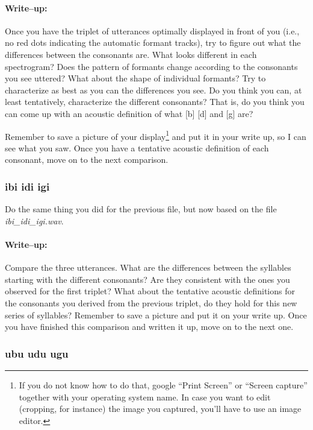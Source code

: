 \paragraph{Write--up:} Once you have the triplet of utterances optimally displayed in front of you (i.e., no red dots indicating the automatic formant tracks), try to figure out what the differences between the consonants are. What looks different in each spectrogram? Does the pattern of formants change according to the consonants you see uttered? What about the shape of individual formants? Try to characterize as best as you can the differences you see. Do you think you can, at least tentatively, characterize the different consonants? That is, do you think you can come up with an acoustic definition of what [b] [d] and [g] are?

Remember to save a picture of your display\footnote{If you do not know how to do that, google ``Print Screen'' or ``Screen capture'' together with your operating system name. In case you want to edit (cropping, for instance) the image you captured, you'll have to use an image editor.} and put it in your write up, so I can see what you saw. Once you have a tentative acoustic definition of each consonant, move on to the next comparison.

\subsubsection{ibi idi igi}

Do the same thing you did for the previous file, but now based on the file \emph{ibi\_idi\_igi.wav}.

\paragraph{Write--up:} Compare the three utterances. What are the differences between the syllables starting with the different consonants? Are they consistent with the ones you observed for the first triplet? What about the tentative acoustic definitions for the consonants you derived from the previous triplet, do they hold for this new series of syllables? Remember to save a picture and put it on your write up. Once you have finished this comparison and written it up, move on to the next one.

\subsubsection{ubu udu ugu}

